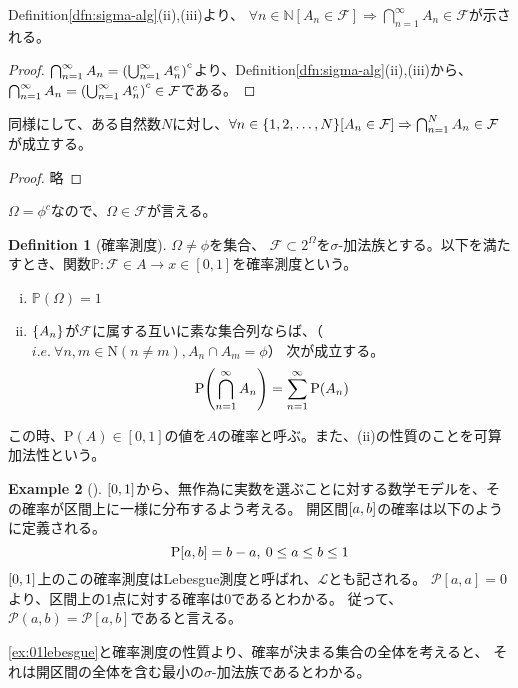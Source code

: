 \documentclass{ltjsarticle}
\theoremstyle{definition}
\newtheorem{dfn}{Definition}[subsection]
\newtheorem{ex}[dfn]{Example}
\begin{document}
Definition\ref{dfn:sigma-alg}(ii),(iii)より、
$\forall n \in \mathbb{N} [A_n \in \mathcal{F}] \Rightarrow \bigcap_{n=1}^{\infty} A_n \in \mathcal{F}$が示される。
\begin{proof}
    $\bigcap_{n=1}^{\infty} A_n = \qty( \bigcup_{n=1}^{\infty} A_{n}^{c} )^{c}$より、Definition\ref{dfn:sigma-alg}(ii),(iii)から、$\bigcap_{n=1}^{\infty} A_n = \qty( \bigcup_{n=1}^{\infty} A_{n}^{c} )^{c} \in \mathcal{F}$である。
\end{proof}

同様にして、ある自然数$N$に対し、$\forall n \in \{1,2,\dots,N \} \qty[A_n \in \mathcal{F}] \Rightarrow \bigcap_{n=1}^{N} A_n \in \mathcal{F}$が成立する。
\begin{proof}
    略
\end{proof}

$\Omega = \phi^{c}$なので、$\Omega \in \mathcal{F}$が言える。

\begin{dfn}[確率測度]\mbox{}
    \label{dfn:measure}
    $\Omega \neq \phi$を集合、 $\mathcal{F} \subset 2^{\Omega}$を$\sigma$-加法族とする。以下を満たすとき、関数$\mathbb{P}:\mathcal{F} \in A \to x \in [0,1]$を確率測度という。
    \begin{enumerate}[(i)]
        \item $\mathbb{P}(\Omega)=1$
        \item $\qty{A_n}$が$\mathcal{F}$に属する互いに素な集合列ならば、（$i.e. \: \forall n,m \in \mathrm{N}(n \neq m), A_n \cap A_m = \phi$）
        次が成立する。
        \begin{equation}
            \mathrm{P} \qty(\bigcap_{n=1}^{\infty} A_n) = \sum_{n=1}^{\infty} \mathrm{P} \qty(A_n)
        \end{equation}
    \end{enumerate}
    この時、$\mathrm{P}(A) \in [0,1]$の値を$A$の確率と呼ぶ。また、(ii)の性質のことを可算加法性という。
\end{dfn}

\begin{ex}[]
    $\qty[0,1]$から、無作為に実数を選ぶことに対する数学モデルを、その確率が区間上に一様に分布するよう考える。
    開区間$\qty[a,b]$の確率は以下のように定義される。
    \begin{equation}
        \label{ex:01lebesgue}
        \mathrm{P} \qty[a,b] = b-a , \: 0 \leq a \leq b \leq 1
    \end{equation}
    $\qty[0,1]$上のこの確率測度はLebesgue測度と呼ばれ、$\mathcal{L}$とも記される。
    $\mathcal{P}[a,a]=0$より、区間上の1点に対する確率は0であるとわかる。
    従って、$\mathcal{P}(a,b)=\mathcal{P}[a,b]$であると言える。

    \ref{ex:01lebesgue}と確率測度の性質より、確率が決まる集合の全体を考えると、
    それは開区間の全体を含む最小の$\sigma$-加法族であるとわかる。
\end{ex}




% 
% 
\end{document}
